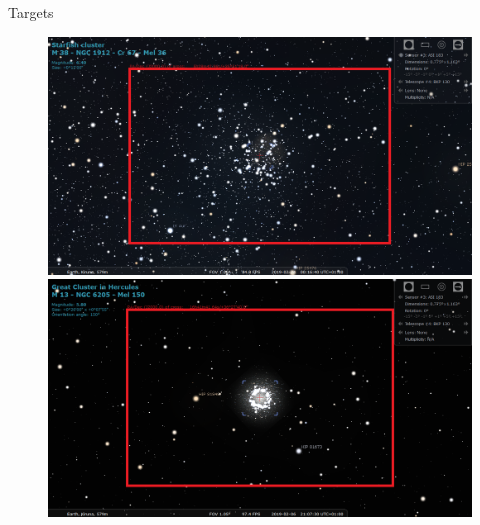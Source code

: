 \documentclass[11pt, aspectratio=169]{beamer}
\begin{document}
\begin{frame}{Targets}
\begin{figure}[!htb]
\begin{minipage}[t]{.425\textwidth}
        \includegraphics[width=\linewidth]{figures/targets/Starfish.png}
    \end{minipage}%
    \begin{minipage}[t]{.425\textwidth}
        \centering
        \includegraphics[width=\linewidth]{figures/targets/Hercules.png}
    \end{minipage}%
\end{figure}
\end{frame}
\end{document}
